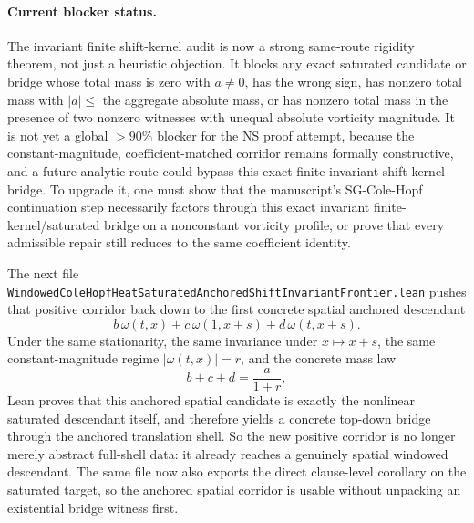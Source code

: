 \documentclass[11pt]{article}
\begin{document}
\paragraph{Current blocker status.}
The invariant finite shift-kernel audit is now a strong same-route rigidity
theorem, not just a heuristic objection.  It blocks any exact saturated
candidate or bridge whose total mass is zero with \(a\neq 0\), has the wrong
sign, has nonzero total mass with \(|a|\le\) the aggregate absolute mass, or
has nonzero total mass in the presence of two nonzero witnesses with unequal
absolute vorticity magnitude.  It is not yet a global \(>90\%\) blocker for
the NS proof attempt, because the constant-magnitude, coefficient-matched
corridor remains formally constructive, and a future analytic route could
bypass this exact finite invariant shift-kernel bridge.  To upgrade it, one
must show that the manuscript's SG-Cole-Hopf continuation step necessarily
factors through this exact invariant finite-kernel/saturated bridge on a
nonconstant vorticity profile, or prove that every admissible repair still
reduces to the same coefficient identity.

The next file
\texttt{WindowedColeHopfHeatSaturatedAnchoredShiftInvariantFrontier.lean}
pushes that positive corridor back down to the first concrete spatial anchored
descendant
\[
  b\,\omega(t,x) + c\,\omega(1,x+s) + d\,\omega(t,x+s).
\]
Under the same stationarity, the same invariance under \(x \mapsto x+s\), the
same constant-magnitude regime \(|\omega(t,x)|=r\), and the concrete mass law
\[
  b + c + d = \frac{a}{1+r},
\]
Lean proves that this anchored spatial candidate is exactly the nonlinear
saturated descendant itself, and therefore yields a concrete top-down bridge
through the anchored translation shell.  So the new positive corridor is no
longer merely abstract full-shell data: it already reaches a genuinely spatial
windowed descendant.  The same file now also exports the direct clause-level
corollary on the saturated target, so the anchored spatial corridor is usable
without unpacking an existential bridge witness first.
\end{document}
